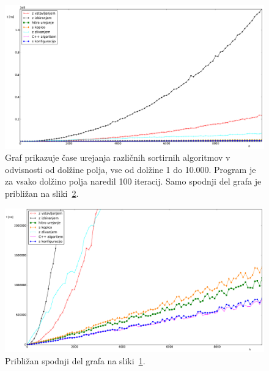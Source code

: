 \documentclass[a4paper,oneside,12pt]{article}
\begin{document}
\begin{figure}[h!]
    \includegraphics[width=\textwidth]{slike/int10000.pdf}
    \vspace{-0.7cm}
    \caption[Rezultati za tip  \emph{int}, 10.000 el.]{Graf prikazuje čase
    urejanja različnih sortirnih algoritmov v odvisnosti od dolžine polja, vse
    od dolžine 1 do 10.000. Program je za vsako dolžino polja naredil 100
    iteracij. Samo spodnji del grafa je približan na sliki~\ref{fig:rez:intblizu}.}
    \label{fig:rez:int}
\end{figure}

\begin{figure}[h!]
    \begin{center}
        \includegraphics[width=\textwidth]{slike/int10000zoom.pdf}
    \end{center}
    \vspace{-0.7cm}
    \caption[Rezultati za tip \emph{int}, 10.000 el. -- približano]{Približan
    spodnji del grafa na sliki~\ref{fig:rez:int}.} 
    \label{fig:rez:intblizu}
\end{figure}

\pagebreak
\end{document}
